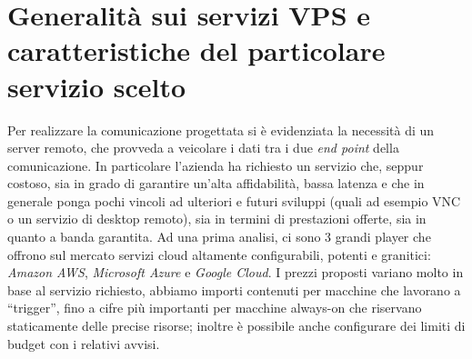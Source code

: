 \section{Generalità sui servizi VPS e caratteristiche del particolare servizio scelto }\label{caratteristiche_vps}

Per realizzare la comunicazione progettata si è evidenziata la necessità di un server remoto, che provveda a veicolare i dati tra i due \textit{end point} della comunicazione.
In particolare l'azienda ha richiesto un servizio che, seppur costoso, sia in grado di garantire un’alta affidabilità, bassa latenza e che in generale ponga pochi vincoli ad ulteriori e futuri sviluppi (quali ad esempio VNC o un servizio di desktop remoto), sia in termini di prestazioni offerte, sia in quanto a banda garantita.
Ad una prima analisi, ci sono 3 grandi player che offrono sul mercato servizi cloud altamente configurabili, potenti e granitici: \textit{Amazon AWS}, \textit{Microsoft Azure} e \textit{Google Cloud}. I prezzi proposti variano molto in base al servizio richiesto, abbiamo importi contenuti per macchine che lavorano a “trigger”, fino a cifre più importanti per macchine always-on che riservano staticamente delle precise risorse; inoltre è possibile anche configurare dei limiti di budget con i relativi avvisi.
